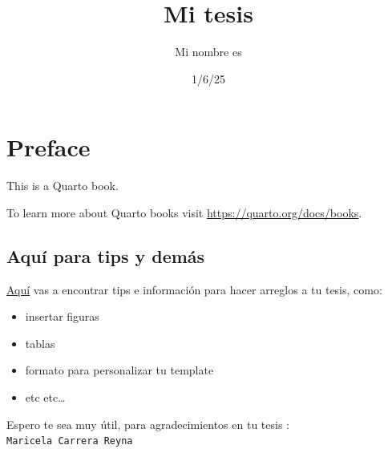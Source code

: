 \documentclass[
  12pt,
  letterpaper,
  DIV=11,
  numbers=noendperiod,
  oneside]{scrreport}
\title{Mi tesis}
\author{Mi nombre es}
\date{1/6/25}
\renewcommand*\contentsname{Tabla de contenidos}
\newcommand\contentsname{Tabla de contenidos}
\begin{document}
\maketitle
\renewcommand*\contentsname{Tabla de contenidos}
{
\hypersetup{linkcolor=Black}
\setcounter{tocdepth}{2}
\tableofcontents
}
\listoffigures
\listoftables
{}

\hypertarget{preface}{%
\chapter*{Preface}\label{preface}}


This is a Quarto book.

To learn more about Quarto books visit
\url{https://quarto.org/docs/books}.

\hypertarget{aquuxed-para-tips-y-demuxe1s}{%
\section*{Aquí para tips y demás}\label{aquuxed-para-tips-y-demuxe1s}}


\href{https://haly-en.github.io/BLOG/posts/Clase_intro/}{Aquí} vas a
encontrar tips e información para hacer arreglos a tu tesis, como:

\begin{itemize}
\item
  insertar figuras
\item
  tablas
\item
  formato para personalizar tu template
\item
  etc etc\ldots{}
\end{itemize}

\begin{tcolorbox}[enhanced jigsaw, coltitle=black, bottomtitle=1mm, toptitle=1mm, colback=white, toprule=.15mm, colframe=quarto-callout-tip-color-frame, left=2mm, opacityback=0, bottomrule=.15mm, breakable, titlerule=0mm, title=\textcolor{quarto-callout-tip-color}{\faLightbulb}\hspace{0.5em}{Tip}, arc=.35mm, rightrule=.15mm, leftrule=.75mm, colbacktitle=quarto-callout-tip-color!10!white, opacitybacktitle=0.6]

Espero te sea muy útil, para agradecimientos en tu tesis :
\texttt{Maricela\ Carrera\ Reyna}

\end{tcolorbox}
\end{document}
